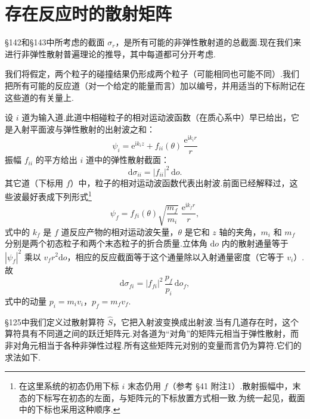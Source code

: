 \section{存在反应时的散射矩阵}

§142和§143中所考虑的截面 $\sigma_r$，是所有可能的非弹性散射道的总截面.现在我们来进行非弹性散射普遍理论的推导，其中每道都可分开考虑.

我们将假定，两个粒子的碰撞结果仍形成两个粒子（可能相同也可能不同）.我们把所有可能的反应道（对一个给定的能量而言）加以编号，并用适当的下标附记在这些道的有关量上.

设 $i$ 道为输入道.此道中相碰粒子的相对运动波函数（在质心系中）早已给出，它是入射平面波与弹性散射的出射波之和：
\begin{equation}
  \psi_i=\mathrm{e}^{\mathrm{i}k_iz}+f_{ii}(\theta)\,\frac{\mathrm{e}^{\mathrm{i}k_ir}}{r}
\end{equation}
振幅 $f_{ii}$ 的平方给出 $i$ 道中的弹性散射截面：
\begin{equation}
  \mathrm{d}\sigma_{ii}=|f_{ii}|^2\,\mathrm{d}o.
\end{equation}
其它道（下标用 $f$）中，粒子的相对运动波函数代表出射波.前面已经解释过，这些波最好表成下列形式\footnote{在这里系统的初态仍用下标 $i$ 末态仍用 $f$（参考 §41 附注1）.散射振幅中，末态的下标写在初态的左面，与矩阵元的下标放置方式相一致.为统一起见，截面中的下标也采用这种顺序.}
\begin{equation}
  \psi_f=f_{fi}(\theta)\sqrt{\frac{m_f}{m_i}}\;\frac{\mathrm{e}^{\mathrm{i}k_fr}}{r},
\end{equation}
式中的 $k_f$ 是 $f$ 道反应产物的相对运动波矢量，$\theta$ 是它和 $z$ 轴的夹角，$m_i$ 和 $m_f$ 分别是两个初态粒子和两个末态粒子的折合质量.立体角 $\mathrm{d}o$ 内的散射通量等于 $|\psi_f|^2$ 乘以 $v_fr^2\mathrm{d}o$，相应的反应截面等于这个通量除以入射通量密度（它等于 $v_i$）.故
\begin{equation}
  \mathrm{d}\sigma_{fi}=|f_{fi}|^2\,\frac{p_f}{p_i}\,\mathrm{d}o_f,
\end{equation}
式中的动量 $p_i=m_iv_i$，$p_f=m_fv_f$.

§125中我们定义过散射算符 $\hat{S}$，它把入射波变换成出射波.当有几道存在时，这个算符具有不同道之间的跃迁矩阵元.对各道为“对角”的矩阵元相当于弹性散射，而非对角元相当于各种非弹性过程.所有这些矩阵元对别的变量而言仍为算符.它们的求法如下.

